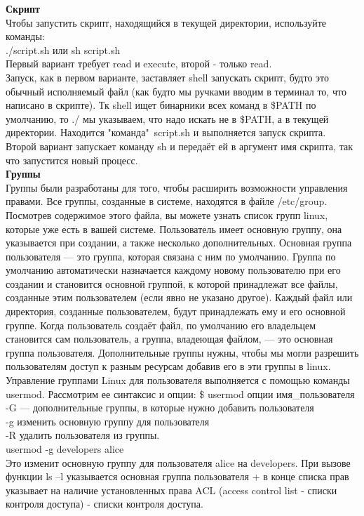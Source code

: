 \noindent \textbf{Скрипт} \\
Чтобы запустить скрипт, находящийся в текущей директории, используйте команды: \\
./script.sh или sh script.sh \\
Первый вариант требует read и execute, второй - только read. \\
Запуск, как в первом варианте, заставляет shell запускать скрипт, будто это обычный исполняемый файл (как будто мы ручками вводим в терминал то, что написано в скрипте). Тк shell ищет бинарники всех команд в \$PATH по умолчанию, то ./ мы указываем, что надо искать не в \$PATH, а в текущей директории. Находится "команда"\, script.sh и выполняется запуск скрипта.  \\
Второй вариант запускает команду sh и передаёт ей в аргумент имя скрипта, так что запустится новый процесс. \\

\noindent \textbf{Группы} \\
Группы были разработаны для того, чтобы расширить возможности управления правами. Все группы, созданные в системе, находятся в файле /etc/group. Посмотрев содержимое этого файла, вы можете узнать список групп linux, которые уже есть в вашей системе. Пользователь имеет основную группу, она указывается при создании, а также несколько дополнительных. Основная группа пользователя — это группа, которая связана с ним по умолчанию.  Группа по умолчанию автоматически назначается каждому новому пользователю при его создании и становится основной группой, к которой принадлежат все файлы, созданные этим пользователем (если явно не указано другое). Каждый файл или директория, созданные пользователем, будут принадлежать ему и его основной группе. Когда пользователь создаёт файл, по умолчанию его владельцем становится сам пользователь, а группа, владеющая файлом, — это основная группа пользователя. Дополнительные группы нужны, чтобы мы могли разрешить пользователям доступ к разным ресурсам добавив его в эти группы в linux. \\
Управление группами Linux для пользователя выполняется с помощью команды usermod. Рассмотрим ее синтаксис и опции:
\$ usermod опции имя\_пользователя \\
-G — дополнительные группы, в которые нужно добавить пользователя \\
-g изменить основную группу для пользователя \\
-R удалить пользователя из группы. \\
usermod -g developers alice \\
Это изменит основную группу для пользователя alice на developers. При вызове функции ls –l указывается основная группа пользователя + в конце списка прав указывает на наличие установленных права ACL (access control list - списки контроля доступа) - списки контроля доступа. \\

